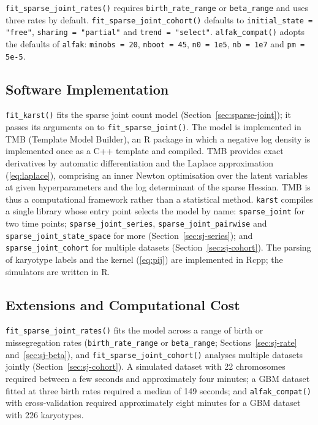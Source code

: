 \documentclass[11pt]{article}
\begin{document}
\begin{sloppypar}
\texttt{fit\_sparse\_joint\_rates()} requires \texttt{birth\_rate\_range} or
\texttt{beta\_range} and uses three rates by default. \texttt{fit\_sparse\_joint\_cohort()} defaults to
\texttt{initial\_state = "free"}, \texttt{sharing = "partial"} and
\texttt{trend = "select"}. \texttt{alfak\_compat()} adopts the defaults of
\texttt{alfak}: \texttt{minobs = 20}, \texttt{nboot = 45},
\texttt{n0 = 1e5}, \texttt{nb = 1e7} and \texttt{pm = 5e-5}.
\end{sloppypar}

\subsection{Software Implementation}
\label{sec:structure}

\texttt{fit\_karst()} fits the sparse joint count model
(Section~\ref{sec:sparse-joint}); it passes its arguments on to
\texttt{fit\_sparse\_joint()}. The model is implemented in TMB (Template Model
Builder), an R package in which a negative log density is implemented once as
a C++ template and compiled. TMB provides exact derivatives by automatic
differentiation and the Laplace approximation (\ref{eq:laplace}), comprising
an inner Newton optimisation over the latent variables at given
hyperparameters and the log determinant of the sparse Hessian. TMB is thus a
computational framework rather than a statistical method. \texttt{karst}
compiles a single library whose entry point selects the model by name:
\texttt{sparse\_joint} for two time points; \texttt{sparse\_joint\_series},
\texttt{sparse\_joint\_pairwise} and \texttt{sparse\_joint\_state\_space} for
more (Section~\ref{sec:sj-series}); and \texttt{sparse\_joint\_cohort} for
multiple datasets (Section~\ref{sec:sj-cohort}). The parsing of karyotype
labels and the kernel (\ref{eq:pij}) are implemented in Rcpp; the simulators
are written in R.

\subsection{Extensions and Computational Cost}

\begin{sloppypar}
\texttt{fit\_sparse\_joint\_rates()} fits the model across a range of birth
or missegregation rates (\texttt{birth\_rate\_range} or \texttt{beta\_range};
Sections~\ref{sec:sj-rate} and~\ref{sec:sj-beta}), and \texttt{fit\_sparse\_joint\_cohort()}
analyses multiple datasets jointly (Section~\ref{sec:sj-cohort}). A simulated
dataset with 22 chromosomes required between a few seconds and approximately
four minutes; a GBM dataset fitted at three birth rates required a median of
149 seconds; and \texttt{alfak\_compat()} with cross-validation required
approximately eight minutes for a GBM dataset with 226 karyotypes.
\end{sloppypar}
\end{document}
